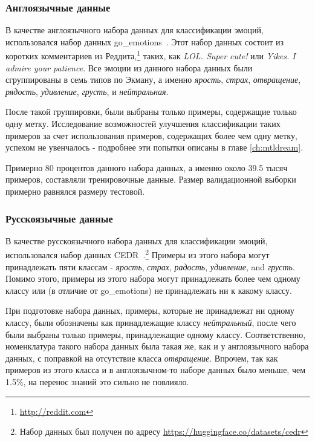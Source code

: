 \subsubsection{Англоязычные данные}
В качестве англоязычного набора данных для классификации эмоций, использовался набор данных {go\_emotions}~\cite{go_emotions}. Этот набор данных состоит из коротких комментариев из Реддита,\footnote{\url{http://reddit.com}} таких, как \textit{LOL. Super cute!} или \textit{Yikes. I admire your patience}. Все эмоции из данного набора данных были сгруппированы в семь типов по Экману, а именно \textit{ярость}, \textit{страх}, \textit{отвращение}, \textit{рядость}, \textit{удивление}, \textit{грусть}, и \textit{нейтральная}.

После такой группировки, были выбраны только примеры, содержащие только одну метку. Исследование возможностей улучшения классификации таких примеров за счет использования примеров, содержащих более чем одну метку, успехом не увенчалось - подробнее эти попытки описаны в главе \ref{ch:mtldream}. 

Примерно 80 процентов данного набора данных, а именно около 39.5 тысяч примеров, составляли тренировочные данные. Размер валидационной выборки примерно равнялся размеру тестовой. 

\subsubsection{Русскоязычные данные}
В качестве русскоязычного набора данных для классификации эмоций, использовался набор данных {CEDR}~\cite{ru_emotions}.\footnote{Набор данных был получен по адресу \url{https://huggingface.co/datasets/cedr}} Примеры из этого набора могут принадлежать пяти классам - \textit{ярость}, \textit{страх}, \textit{радость}, \textit{удивление}, and \textit{грусть}. Помимо этого, примеры из этого набора могут принадлежать более чем одному классу или (в отличие от {go\_emotions}) не принадлежать ни к какому классу.

При подготовке набора данных, примеры, которые не принадлежат ни одному классу, были обозначены как принадлежащие классу \textit{нейтральный}, после чего были выбраны только примеры, принадлежащие одному классу. Соответственно, номенклатура такого набора данных была такая же, как и у англоязычного набора данных, с поправкой на отсутствие класса \textit{отвращение}. Впрочем, так как примеров из этого класса и в англоязычном-то наборе данных было меньше, чем 1.5\%, на перенос знаний это сильно не повлияло. 

